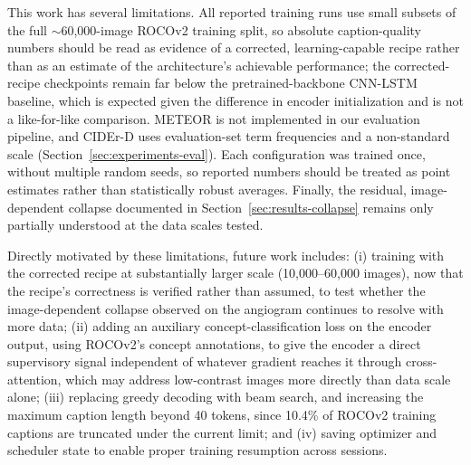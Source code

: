 \documentclass[conference]{IEEEtran}
\begin{document}
This work has several limitations. All reported training runs use small subsets of the full $\sim$60,000-image ROCOv2 training split, so absolute caption-quality numbers should be read as evidence of a corrected, learning-capable recipe rather than as an estimate of the architecture's achievable performance; the corrected-recipe checkpoints remain far below the pretrained-backbone CNN-LSTM baseline, which is expected given the difference in encoder initialization and is not a like-for-like comparison. METEOR is not implemented in our evaluation pipeline, and CIDEr-D uses evaluation-set term frequencies and a non-standard scale (Section~\ref{sec:experiments-eval}). Each configuration was trained once, without multiple random seeds, so reported numbers should be treated as point estimates rather than statistically robust averages. Finally, the residual, image-dependent collapse documented in Section~\ref{sec:results-collapse} remains only partially understood at the data scales tested.

Directly motivated by these limitations, future work includes: (i) training with the corrected recipe at substantially larger scale (10,000--60,000 images), now that the recipe's correctness is verified rather than assumed, to test whether the image-dependent collapse observed on the angiogram continues to resolve with more data; (ii) adding an auxiliary concept-classification loss on the encoder output, using ROCOv2's concept annotations, to give the encoder a direct supervisory signal independent of whatever gradient reaches it through cross-attention, which may address low-contrast images more directly than data scale alone; (iii) replacing greedy decoding with beam search, and increasing the maximum caption length beyond 40 tokens, since 10.4\% of ROCOv2 training captions are truncated under the current limit; and (iv) saving optimizer and scheduler state to enable proper training resumption across sessions.
\end{document}
